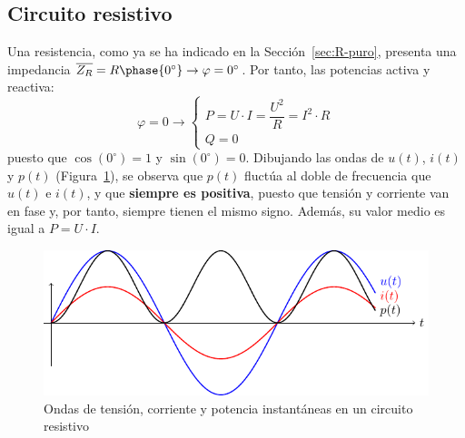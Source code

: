 	\subsection{Circuito resistivo}\label{sec.potencia_R}
	Una resistencia, como ya se ha indicado en la
        Sección~\ref{sec:R-puro}, presenta una impedancia
        $\overline{Z_R}=R\phase{0^\circ}\rightarrow
        \varphi=0^\circ$. Por tanto, las potencias activa y reactiva:
	\begin{equation}
          \varphi = 0 \rightarrow
          \boxed{\begin{cases}
            P = U\cdot I = \dfrac{U^2}{R} = I^2\cdot R\\
            Q = 0
          \end{cases}}
      \end{equation}
      puesto que $\cos(0^\circ)=1$ y $\sin(0^\circ)=0$. Dibujando las
      ondas de $u(t)$, $i(t)$ y $p(t)$
      (Figura~\ref{fig.resistivoPotencia}), se observa que $p(t)$
      fluctúa al doble de frecuencia que $u(t)$ e $i(t)$, y que
      \textbf{siempre es positiva}, puesto que tensión y corriente van
      en fase y, por tanto, siempre tienen el mismo signo. Además, su
      valor medio es igual a $P=U\cdot I$.
      \begin{figure}[H]
        \centering \includegraphics{../figs/resistivoPotencia.pdf}
        \caption{Ondas de tensión, corriente y potencia instantáneas
          en un circuito resistivo}
        \label{fig.resistivoPotencia}
      \end{figure}
	
